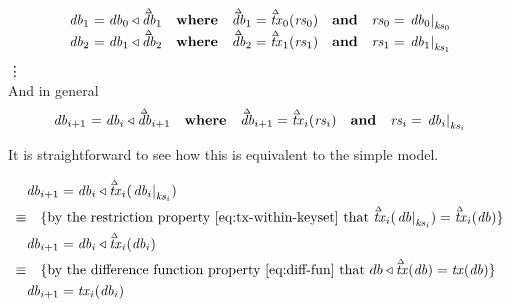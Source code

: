 \documentclass[11pt,a4paper]{article}
\newcommand\restrict[2]{\left.#1\right|_{#2}}
\newcommand\deltavar[1]{\accentset{\Delta}{#1}}
\begin{document}
\begin{center}
\begin{equation*}
\begin{array}{c@{~}l@{\quad}l@{\quad}l}
  \mathit{db}_1 & = \mathit{db}_0 \triangleleft \deltavar{\mathit{db}}_1
                & \mathbf{where} \quad \deltavar{\mathit{db}}_1 = \deltavar{\mathit{tx}}_0(\mathit{rs}_0)
                & \mathbf{and} \quad \mathit{rs}_0 = \restrict{\mathit{db}_0}{\mathit{ks}_0} \\
  \mathit{db}_2 & = \mathit{db}_1 \triangleleft \deltavar{\mathit{db}}_2
                & \mathbf{where} \quad \deltavar{\mathit{db}}_2 = \deltavar{\mathit{tx}}_1(\mathit{rs}_1)
                & \mathbf{and} \quad \mathit{rs}_1 = \restrict{\mathit{db}_1}{\mathit{ks}_1} \\
\end{array}
\end{equation*}
\vdots \\
And in general
\begin{equation*}
\begin{array}{c@{~}l@{\quad}l@{\quad}l}
  \mathit{db}_{i+1} & = \mathit{db}_i \triangleleft \deltavar{\mathit{db}}_{i+1}
                    & \mathbf{where} \quad \deltavar{\mathit{db}}_{i+1} = \deltavar{\mathit{tx}}_i(\mathit{rs}_i)
                    & \mathbf{and} \quad \mathit{rs}_i = \restrict{\mathit{db}_i}{\mathit{ks}_i} \\
\end{array}
\end{equation*}
\end{center}

It is straightforward to see how this is equivalent to the simple model.

\begin{align*}
         & \mathit{db}_{i+1} = \mathit{db}_i \triangleleft \deltavar{\mathit{tx}}_i(\restrict{\mathit{db}_i}{\mathit{ks}_i}) \\
  \equiv & \quad \text{\{by the restriction property \cref{eq:tx-within-keyset} that
                      $\deltavar{\mathit{tx}}_i(\restrict{\mathit{db}}{\mathit{ks}_i}) = \deltavar{\mathit{tx}}_i(\mathit{db})$\}} \\
         & \mathit{db}_{i+1} = \mathit{db}_i \triangleleft \deltavar{\mathit{tx}}_i(\mathit{db}_i) \\
  \equiv & \quad \text{\{by the difference function property \cref{eq:diff-fun} that
                      $db \triangleleft \deltavar{\mathit{tx}}(\mathit{db}) = \mathit{tx}(\mathit{db})$\}} \\
         & \mathit{db}_{i+1} = \mathit{tx}_i(\mathit{db}_i)
\end{align*}
\end{document}
